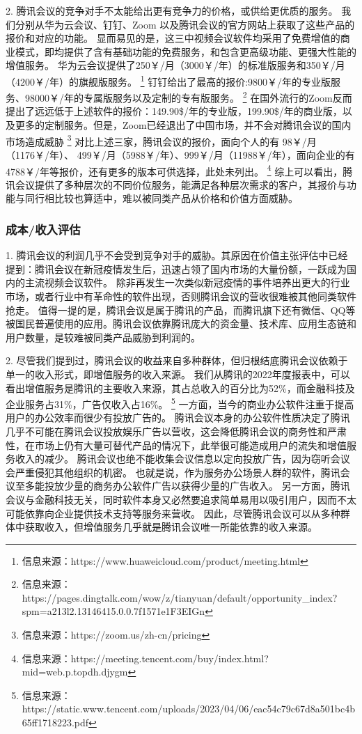 \documentclass[a4paper,12pt]{article}
\begin{document}
    2.
    腾讯会议的竞争对手不太能给出更有竞争力的价格，或供给更优质的服务。
    我们分别从华为云会议、钉钉、Zoom 以及腾讯会议的官方网站上获取了这些产品的报价和对应的功能。
    显而易见的是，这三中视频会议软件均采用了免费增值的商业模式，即均提供了含有基础功能的免费服务，和包含更高级功能、更强大性能的增值服务。
    华为云会议提供了250￥/月（3000￥/年）的标准版服务和350￥/月（4200￥/年）的旗舰版服务。
    \footnote{信息来源：https://www.huaweicloud.com/product/meeting.html}
    钉钉给出了最高的报价:9800￥/年的专业版服务、98000￥/年的专属版服务以及定制的专有版服务。
    \footnote{信息来源：https://pages.dingtalk.com/wow/z/tianyuan/default/opportunity\_index?spm=a213l2.13146415.0.0.7f1571e1F3EIGn}
    在国外流行的Zoom反而提出了远远低于上述软件的报价：149.90\$/年的专业版，199.90\$/年的商业版，以及更多的定制服务。但是，Zoom已经退出了中国市场，并不会对腾讯会议的国内市场造成威胁
    \footnote{信息来源：https://zoom.us/zh-cn/pricing}
    对比上述三家，腾讯会议的报价，面向个人的有 98￥/月（1176￥/年）、 499￥/月（5988￥/年）、999￥/月（11988￥/年），面向企业的有4788￥/年等报价，还有更多的版本可供选择，此处未列出。
    \footnote{信息来源：https://meeting.tencent.com/buy/index.html?mid=web.p.topdh.djygm}
    综上可以看出，腾讯会议提供了多种层次的不同价位服务，能满足各种层次需求的客户，其报价与功能与同行相比较也算适中，难以被同类产品从价格和价值方面威胁。


    \subsubsection{成本/收入评估}
    1.
    腾讯会议的利润几乎不会受到竞争对手的威胁。其原因在价值主张评估中已经提到：腾讯会议在新冠疫情发生后，迅速占领了国内市场的大量份额，一跃成为国内的主流视频会议软件。
    除非再发生一次类似新冠疫情的事件培养出更大的行业市场，或者行业中有革命性的软件出现，否则腾讯会议的营收很难被其他同类软件抢走。
    值得一提的是，腾讯会议是属于腾讯的产品，而腾讯旗下还有微信、QQ等被国民普遍使用的应用。腾讯会议依靠腾讯庞大的资金量、技术库、应用生态链和用户数量，是较难被同类产品威胁到利润的。


    2.
    尽管我们提到过，腾讯会议的收益来自多种群体，但归根结底腾讯会议依赖于单一的收入形式，即增值服务的收入来源。
    我们从腾讯的2022年度报表中，可以看出增值服务是腾讯的主要收入来源，其占总收入的百分比为52\%，而金融科技及企业服务占31\%，广告仅收入占16\%。
    \footnote{信息来源：https://static.www.tencent.com/uploads/2023/04/06/eac54c79c67d8a501bc4b65ff1718223.pdf}
    一方面，当今的商业办公软件注重于提高用户的办公效率而很少有投放广告的。
    腾讯会议本身的办公软件性质决定了腾讯几乎不可能在腾讯会议投放娱乐广告以营收，这会降低腾讯会议的商务性和严肃性，在市场上仍有大量可替代产品的情况下，此举很可能造成用户的流失和增值服务收入的减少。
    腾讯会议也绝不能收集会议信息以定向投放广告，因为窃听会议会严重侵犯其他组织的机密。
    也就是说，作为服务办公场景人群的软件，腾讯会议至多能投放少量的商务办公软件广告以获得少量的广告收入。
    另一方面，腾讯会议与金融科技无关，同时软件本身又必然要追求简单易用以吸引用户，因而不太可能依靠向企业提供技术支持等服务来营收。
    因此，尽管腾讯会议可以从多种群体中获取收入，但增值服务几乎就是腾讯会议唯一所能依靠的收入来源。
\end{document}
